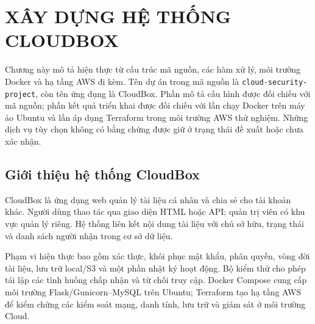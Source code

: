 \chapter{XÂY DỰNG HỆ THỐNG CLOUDBOX}
\label{chap:hienthuc}
Chương này mô tả hiện thực từ cấu trúc mã nguồn, các hàm xử lý, môi trường Docker và hạ tầng AWS đi kèm. Tên dự án trong mã nguồn là \texttt{cloud-security-project}, còn tên ứng dụng là CloudBox. Phần mô tả cấu hình được đối chiếu với mã nguồn; phần kết quả triển khai được đối chiếu với lần chạy Docker trên máy ảo Ubuntu và lần áp dụng Terraform trong môi trường AWS thử nghiệm. Những dịch vụ tùy chọn không có bằng chứng được giữ ở trạng thái đề xuất hoặc chưa xác nhận.

\section{Giới thiệu hệ thống CloudBox}
CloudBox là ứng dụng web quản lý tài liệu cá nhân và chia sẻ cho tài khoản khác. Người dùng thao tác qua giao diện HTML hoặc API; quản trị viên có khu vực quản lý riêng. Hệ thống liên kết nội dung tài liệu với chủ sở hữu, trạng thái và danh sách người nhận trong cơ sở dữ liệu.

Phạm vi hiện thực bao gồm xác thực, khôi phục mật khẩu, phân quyền, vòng đời tài liệu, lưu trữ local/S3 và một phần nhật ký hoạt động. Bộ kiểm thử cho phép tái lập các tình huống chấp nhận và từ chối truy cập. Docker Compose cung cấp môi trường Flask/Gunicorn--MySQL trên Ubuntu; Terraform tạo hạ tầng AWS để kiểm chứng các kiểm soát mạng, danh tính, lưu trữ và giám sát ở môi trường Cloud.

